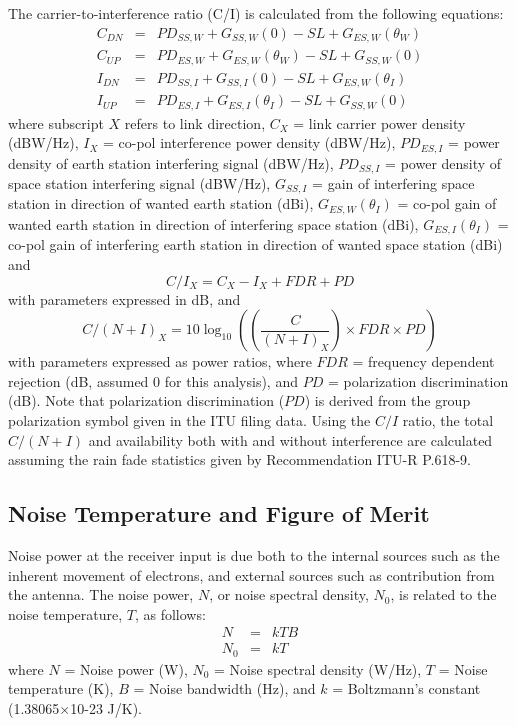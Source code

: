 \documentclass[11pt]{article}
\begin{document}
The carrier-to-interference ratio (C/I) is calculated from the
following equations:
\begin{eqnarray}
  C_{DN} &=& PD_{SS,W} + G_{SS,W}(0) - SL + G_{ES,W}(\theta_W) \\
  C_{UP} &=& PD_{ES,W} + G_{ES,W}(\theta_W) - SL + G_{SS,W}(0) \\
  I_{DN} &=& PD_{SS,I} + G_{SS,I}(0) - SL + G_{ES,W}(\theta_I) \\
  I_{UP} &=& PD_{ES,I} + G_{ES,I}(\theta_I) - SL + G_{SS,W}(0)
\end{eqnarray}
where subscript $X$ refers to link direction, $C_X$ = link carrier
power density (dBW/Hz), $I_{X}$ = co-pol interference power density
(dBW/Hz), $PD_{ES,I}$ = power density of earth station interfering
signal (dBW/Hz), $PD_{SS,I}$ = power density of space station
interfering signal (dBW/Hz), $G_{SS,I}$ = gain of interfering space
station in direction of wanted earth station (dBi),
$G_{ES,W}(\theta_I)$ = co-pol gain of wanted earth station in
direction of interfering space station (dBi), $G_{ES,I}(\theta_I)$ =
co-pol gain of interfering earth station in direction of wanted space
station (dBi) and
\begin{equation}
  C / I_X = C_X - I_X + FDR + PD
\end{equation}
with parameters expressed in dB, and
\begin{equation}
  C / (N + I)_X = 10\log_{10}\left(\left(\frac{C}{(N + I)_X}\right)\times FDR \times PD\right)
\end{equation}
with parameters expressed as power ratios, where $FDR$ = frequency
dependent rejection (dB, assumed 0 for this analysis), and $PD$ =
polarization discrimination (dB). Note that polarization
discrimination ($PD$) is derived from the group polarization symbol
given in the ITU filing data. Using the $C/I$ ratio, the total
$C/(N+I)$ and availability both with and without interference are
calculated assuming the rain fade statistics given by Recommendation
ITU-R P.618-9.

\subsection{Noise Temperature and Figure of Merit}

Noise power at the receiver input is due both to the internal sources
such as the inherent movement of electrons, and external sources such
as contribution from the antenna.  The noise power, $N$, or noise
spectral density, $N_0$, is related to the noise temperature, $T$, as
follows:
\begin{eqnarray}
  N &=& kTB \\
  N_0 &=& kT
\end{eqnarray}
where $N$ = Noise power (W), $N_0$ = Noise spectral density (W/Hz),
$T$ = Noise temperature (K), $B$ = Noise bandwidth (Hz), and $k$ =
Boltzmann’s constant (1.38065×10-23 J/K).
\end{document}
